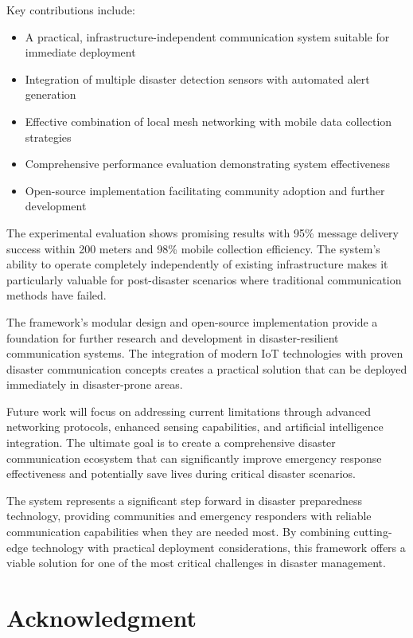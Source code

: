 \documentclass[conference]{IEEEtran}
\begin{document}
Key contributions include:

\begin{itemize}
\item A practical, infrastructure-independent communication system suitable for immediate deployment
\item Integration of multiple disaster detection sensors with automated alert generation
\item Effective combination of local mesh networking with mobile data collection strategies
\item Comprehensive performance evaluation demonstrating system effectiveness
\item Open-source implementation facilitating community adoption and further development
\end{itemize}

The experimental evaluation shows promising results with 95\% message delivery success within 200 meters and 98\% mobile collection efficiency. The system's ability to operate completely independently of existing infrastructure makes it particularly valuable for post-disaster scenarios where traditional communication methods have failed.

The framework's modular design and open-source implementation provide a foundation for further research and development in disaster-resilient communication systems. The integration of modern IoT technologies with proven disaster communication concepts creates a practical solution that can be deployed immediately in disaster-prone areas.

Future work will focus on addressing current limitations through advanced networking protocols, enhanced sensing capabilities, and artificial intelligence integration. The ultimate goal is to create a comprehensive disaster communication ecosystem that can significantly improve emergency response effectiveness and potentially save lives during critical disaster scenarios.

The system represents a significant step forward in disaster preparedness technology, providing communities and emergency responders with reliable communication capabilities when they are needed most. By combining cutting-edge technology with practical deployment considerations, this framework offers a viable solution for one of the most critical challenges in disaster management.

\section*{Acknowledgment}
\end{document}
